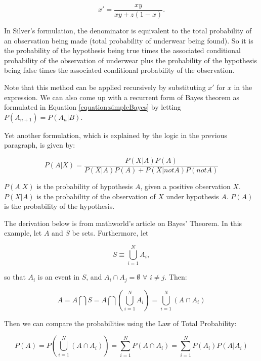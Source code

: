 \begin{equation}
x' = \frac{xy}{xy+z(1-x)}.
\end{equation}

In Silver's formulation, the denominator is equivalent to the total probability of an observation being made (total probability of underwear being found). So it is the probability of the hypothesis being true times the associated conditional probability of the observation of underwear plus the probability of the hypothesis being false times the associated conditional probability of the observation.

Note that this method can be applied recursively by substituting $x'$ for $x$ in the expression. We can also come up with a recurrent form of Bayes theorem as formulated in Equation \ref{equation:simpleBayes} by letting $P(A_{n+1}) = P(A_{n}|B)$.

Yet another formulation, which is explained by the logic in the previous paragraph, is given by: 

\begin{equation}
P(A|X) = \frac{P(X|A) P(A)}{P(X|A) P(A) + P(X|not A)P(not A)}
\end{equation}

$P(A|X)$ is the probability of hypothesis $A$, given a positive observation $X$. $P(X|A)$ is the probability of the observation of $X$ under hypothesis $A$. $P(A)$ is the probability of the hypothesis.

The derivation below is from mathworld's article on Bayes' Theorem. In this example, let $A$ and $S$ be sets. Furthermore, let 

\begin{equation}
S \equiv \bigcup_{i=1}^{N} A_{i},
\end{equation}

so that $A_{i}$ is an event in $S$, and $A_{i} \cap A_{j} = \emptyset$ $\forall$ $i \not= j$. Then:

\begin{equation}
A = A \bigcap S = A \bigcap ( \bigcup_{i=1}^{N} A_{i} ) = \bigcup_{i=1}^{N} (A \cap A_{i})
\end{equation}

Then we can compare the probabilities using the Law of Total Probability:

\begin{equation}
P(A) = P(\bigcup_{i=1}^{N} (A \cap A_{i}))=\sum_{i=1}^{N} P(A \cap A_{i}) = \sum_{i=1}^{N} P(A_{i}) P(A|A_{i})
\end{equation}

